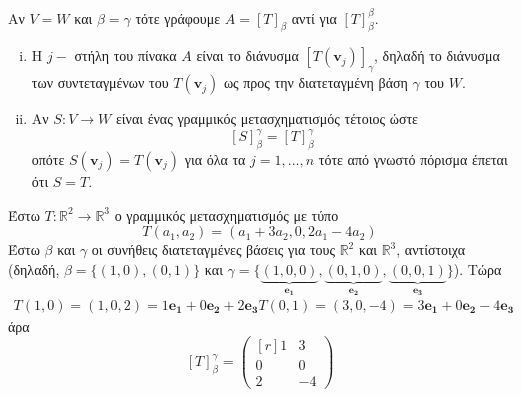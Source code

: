 \begin{rem}
  Αν $ V=W $ και $ \beta = \gamma $ τότε γράφουμε $ A = [T]_{\beta} $ αντί για 
  $ [T]_{\beta}^{\beta} $.
\end{rem}

\begin{rem}\label{rem:1}
\item {}
  \begin{enumerate}[i)]
    \item Η $ j- $ στήλη του πίνακα $A$ είναι το διάνυσμα 
      $ [T(\mathbf{v}_{j})]_{\gamma} $, δηλαδή το διάνυσμα των συντεταγμένων του 
      $ T(\mathbf{v}_{j}) $ ως προς την διατεταγμένη βάση $\gamma$ του $W$.
    \item\label{rem:2} Αν $ S \colon V \to W $ είναι ένας γραμμικός μετασχηματισμός 
      τέτοιος ώστε 
      \[
        [S]_{\beta}^{\gamma} = [T]_{\beta}^{\gamma}
      \] 
      οπότε $ S(\mathbf{v}_{j}) = T(\mathbf{v}_{j}) $ για όλα τα $ j = 1,\ldots, n $ 
      τότε από γνωστό πόρισμα έπεται ότι $ S=T $. %
  \end{enumerate}
\end{rem}

\begin{example}
  Έστω $ T \colon \mathbb{R}^{2} \to \mathbb{R}^{3} $ ο γραμμικός μετασχηματισμός με 
  τύπο 
  \[
    T(a_{1}, a_{2}) = (a_{1}+3 a_{2}, 0, 2 a_{1}- 4 a_{2}) 
  \] 
  Έστω $\beta$ και $\gamma$ οι συνήθεις διατεταγμένες βάσεις για τους $ \mathbb{R}^{2} $
  και $ \mathbb{R}^{3} $, αντίστοιχα (δηλαδή, $ \beta = \{ (1,0), (0,1) \} $ και 
  $ \gamma = \{ \underbrace{(1,0,0)}_{\mathbf{e_{1}}},
  \underbrace{(0,1,0)}_{\mathbf{e_{2}}}, \underbrace{(0,0,1)}_{\mathbf{e_{3}}} \} $). 
  Τώρα
  \begin{align*}
    T(1,0) = (1,0,2) = 1 \mathbf{e_{1}} + 0 \mathbf{e_{2}}+2 \mathbf{e_{3}}
    T(0,1) = (3,0,-4) = 3 \mathbf{e_{1}}+ 0 \mathbf{e_{2}}- 4 \mathbf{e_{3}}
  \end{align*}
  άρα
  \[
    [T]_{\beta}^{\gamma} = 
    \begin{pmatrix*}[r]
      1 & 3 \\
      0 & 0 \\
      2 & -4
    \end{pmatrix*}
  \] 
\end{example}

